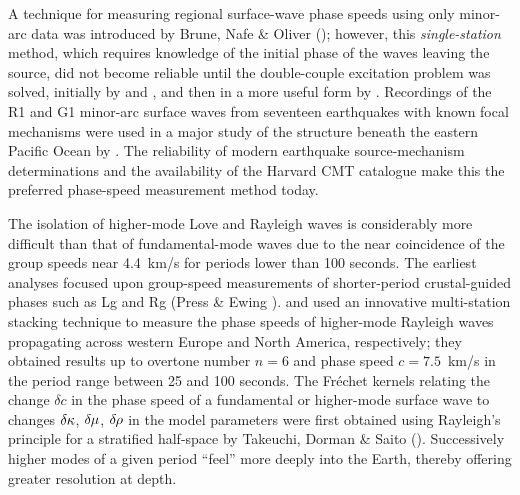 A technique for measuring regional surface-wave phase
speeds using only minor-arc data
was introduced by Brune, Nafe \& Oliver (\citeyear{brune&al60});
however, this {\em single-station\/} method,
%
which requires knowledge of the initial phase
of the waves leaving the source, did not become
reliable until the double-couple excitation problem
was solved, initially by \textcite{haskell64} and
\textcite{ben-menahem&harkrider64}, and then in a more useful
form by \textcite{saito67}.  Recordings of the R1 and G1
minor-arc surface waves from seventeen
earthquakes with known focal mechanisms were used in a major study
of the structure beneath the eastern Pacific Ocean by \textcite{forsyth75}.
The reliability of modern earthquake source-mechanism determinations and
the availability of the Harvard CMT catalogue make this the preferred
phase-speed measurement method today.

The isolation of higher-mode Love and Rayleigh waves is considerably
more difficult than that of fundamental-mode waves due to the near
coincidence of the group speeds near 4.4~km/s for periods lower than
100 seconds.  The earliest analyses focused upon group-speed measurements
of shorter-period crustal-guided phases such as Lg and Rg
(Press \& Ewing \citeyear{press&ewing52}).  
\textcite{nolet77} and \textcite{cara78} used
an innovative multi-station stacking technique
to measure the phase speeds of higher-mode Rayleigh waves
propagating across western Europe and North America, respectively;
they obtained results up to overtone number $n=6$ and phase
speed $c=7.5$~km/s in the period range between 25 and 100 seconds.
The Fr\'{e}chet kernels
%
relating the change $\delta c$
in the phase speed of a fundamental or higher-mode
surface wave to changes $\delta\hspace{-0.1 mm}\kappa$,
$\delta\hspace{-0.1 mm}\mu$, $\delta\hspace{-0.2 mm}\rho$
in the model parameters were first obtained using Rayleigh's
principle for a stratified half-space by
Takeuchi, Dorman \& Saito (\citeyear{takeuchi&al64}).
Successively higher modes of a given period ``feel''
more deeply into the Earth, thereby offering
greater resolution at depth.

